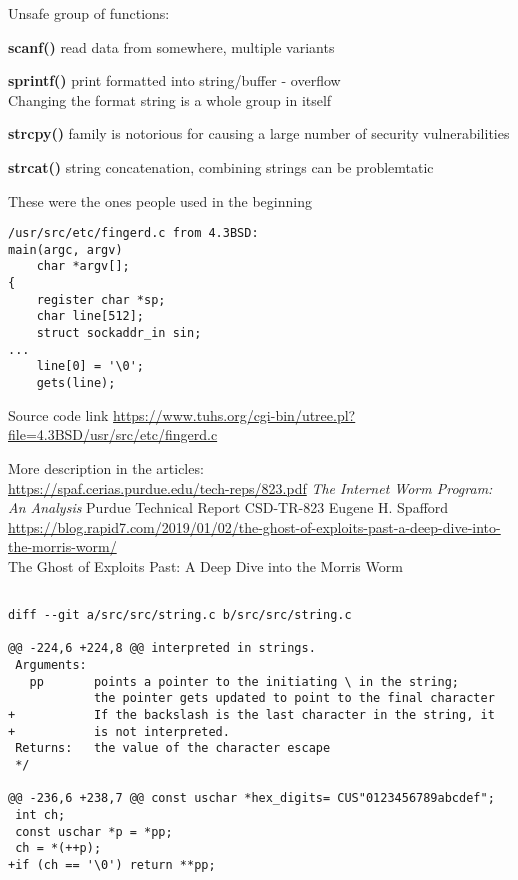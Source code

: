 \documentclass[Screen16to9,17pt]{foils}
\begin{document}

\begin{list2}
\item Unsafe group of functions:
\item {\bf scanf()} read data from somewhere, multiple variants
\item {\bf sprintf()} print formatted into string/buffer - overflow\\
Changing the format string is a whole group in itself
\item {\bf strcpy()} family is notorious for causing a large number of security vulnerabilities
\item {\bf strcat()} string concatenation, combining strings can be problemtatic
\end{list2}

\vskip 1cm
\centerline{These were the ones people used in the beginning}



\begin{verbatim}
/usr/src/etc/fingerd.c from 4.3BSD:
main(argc, argv)
	char *argv[];
{
	register char *sp;
	char line[512];
	struct sockaddr_in sin;
...
	line[0] = '\0';
	gets(line);
\end{verbatim}

Source code link \url{https://www.tuhs.org/cgi-bin/utree.pl?file=4.3BSD/usr/src/etc/fingerd.c}

More description in the articles:\\
{\footnotesize\url{https://spaf.cerias.purdue.edu/tech-reps/823.pdf}} \emph{The Internet Worm Program: An Analysis}
Purdue Technical Report CSD-TR-823
Eugene H. Spafford\\ {\footnotesize\url{https://blog.rapid7.com/2019/01/02/the-ghost-of-exploits-past-a-deep-dive-into-the-morris-worm/}}\\ The Ghost of Exploits Past: A Deep Dive into the Morris Worm



\begin{verbatim}

diff --git a/src/src/string.c b/src/src/string.c

@@ -224,6 +224,8 @@ interpreted in strings.
 Arguments:
   pp       points a pointer to the initiating \ in the string;
            the pointer gets updated to point to the final character
+           If the backslash is the last character in the string, it
+           is not interpreted.
 Returns:   the value of the character escape
 */

@@ -236,6 +238,7 @@ const uschar *hex_digits= CUS"0123456789abcdef";
 int ch;
 const uschar *p = *pp;
 ch = *(++p);
+if (ch == '\0') return **pp;
\end{verbatim}
\end{document}
